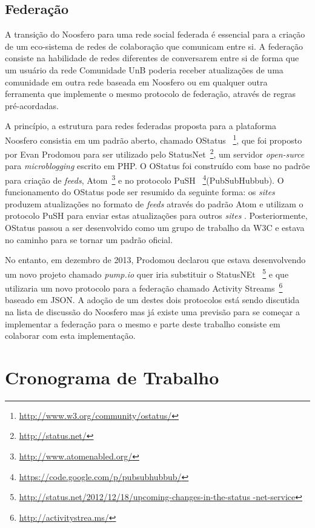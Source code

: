 
\subsection{Federação}

A transição do Noosfero para uma rede social federada é essencial para a criação
de um eco-sistema de redes de colaboração que comunicam entre si. A federação
consiste na habilidade de redes diferentes de conversarem entre si de forma que
um usuário da rede Comunidade UnB poderia receber atualizações de uma comunidade
em outra rede baseada em Noosfero ou em qualquer outra ferramenta que implemente
o mesmo protocolo de federação, através de regras pré-acordadas.

A princípio, a estrutura para redes federadas proposta para a plataforma Noosfero
consistia em um padrão aberto, chamado OStatus
~\footnote{\url{http://www.w3.org/community/ostatus/}}, que foi proposto
por Evan Prodomou para ser utilizado pelo StatusNet~\footnote{\url{
http://status.net/}}, um servidor  \textit{open-surce} para
\textit{microblogging} escrito em PHP.
%
O OStatus foi construído com base no padrõe para criação de \textit{feeds},
Atom~\footnote{\url{http://www.atomenabled.org/}} e no protocolo PuSH
~\footnote{\url{https://code.google.com/p/pubsubhubbub/}}(PubSubHubbub).
O funcionamento do OStatus pode ser resumido da seguinte forma:
os \textit{sites} produzem atualizações no formato de \textit{feeds} através
do padrão Atom e utilizam o protocolo PuSH para enviar estas atualizações
para outros \textit{sites} \cite{OStatusBasics}.
%
Posteriormente, OStatus passou a ser desenvolvido como um grupo de trabalho
da W3C e estava no caminho para se tornar um padrão oficial. 

No entanto, em dezembro de 2013, Prodomou declarou que estava desenvolvendo
um novo projeto chamado \textit{pump.io} quer iria substituir o StatusNEt
~\footnote{\url{http://status.net/2012/12/18/upcoming-changes-in-the-status
-net-service}} e que utilizaria um novo protocolo para a federação chamado
Activity Streams~\footnote{\url{http://activitystrea.ms/}} baseado em JSON.
A adoção de um destes dois protocolos está sendo discutida na lista de 
discussão do Noosfero mas já existe uma previsão para se começar a implementar
a federação para o mesmo e parte deste trabalho consiste em colaborar com
esta implementação.


\section{Cronograma de Trabalho}

